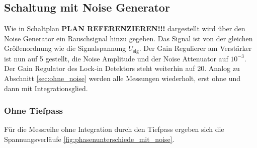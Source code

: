 \subsection{Schaltung mit Noise Generator}
\label{sec:mit_noise}
Wie in Schaltplan \textbf{PLAN REFERENZIEREN!!!} dargestellt wird über den Noise Generator ein Rauschsignal hinzu gegeben.
Das Signal ist von der gleichen Größenordnung wie die Signalspannung $U_\text{sig}$.
Der Gain Regulierer am Verstärker ist nun auf 5 gestellt, die Noise Amplitude und der Noise Attenuator auf $10^{-3}$.
Der Gain Regulator des Lock-in Detektors steht weiterhin auf 20.
Analog zu Abschnitt \ref{sec:ohne_noise} werden alle Messungen wiederholt, erst ohne und dann mit Integrationsglied.


\subsubsection{Ohne Tiefpass}
\label{sec:mit_noise_ohne_tp}
Für die Messreihe ohne Integration durch den Tiefpass ergeben sich die Spannungsverläufe \ref{fig:phasenunterschiede_mit_noise}.
%
%
